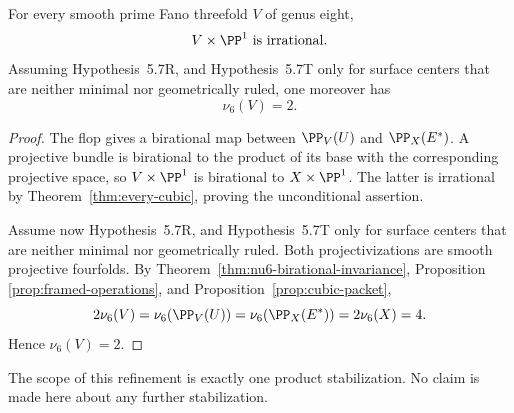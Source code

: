 \begin{corollary}
\label{cor:v14-one-step}
%
%
For every smooth prime Fano threefold \(V\) of genus eight,
\[
  V\times\PP^1\ \text{is irrational}.
\]
Assuming Hypothesis~5.7R, and Hypothesis~5.7T only for surface centers that are
neither minimal nor geometrically ruled, one moreover has
\[
  \nu_6(V)=2.
  \label{eq:v14-stabilization}
\]
\end{corollary}

\begin{proof}
The flop gives a birational map between \(\PP_V(U)\) and
\(\PP_X(E^*)\).  A projective bundle is birational to the product of its
base with the corresponding projective space, so
\(V\times\PP^1\) is birational to \(X\times\PP^1\).  The latter is
irrational by Theorem~\ref{thm:every-cubic}, proving the unconditional
assertion.

Assume now Hypothesis~5.7R, and Hypothesis~5.7T only for surface centers that are
neither minimal nor geometrically ruled.  Both projectivizations are smooth
projective fourfolds.  By Theorem~\ref{thm:nu6-birational-invariance}, Proposition
\ref{prop:framed-operations}, and Proposition~\ref{prop:cubic-packet},
\[
  2\nu_6(V)=\nu_6(\PP_V(U))
  =\nu_6(\PP_X(E^*))=2\nu_6(X)=4.
\]
Hence \(\nu_6(V)=2\).
\end{proof}

The scope of this refinement is exactly one product stabilization.  No claim
is made here about any further stabilization.
